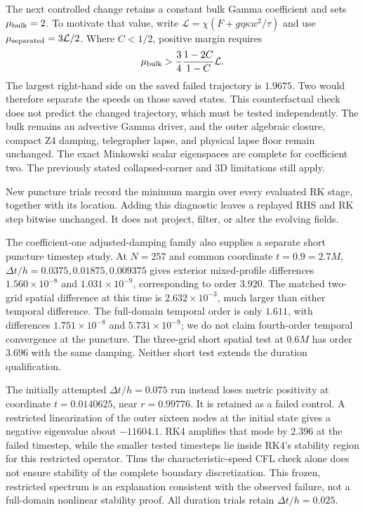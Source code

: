 \documentclass[11pt]{article}
\begin{document}
The next controlled change retains a constant bulk Gamma coefficient and sets $\mu_{\rm bulk}=2$. To motivate that value, write $\mathcal L=\chi(F+g\eta\kappa w^2/\tau)$ and use $\mu_{\rm separated}=3\mathcal L/2$. Where $C<1/2$, positive margin requires
\begin{equation}
 \mu_{\rm bulk}>\frac34\frac{1-2C}{1-C}\mathcal L.
\end{equation}
The largest right-hand side on the saved failed trajectory is $1.9675$. Two would therefore separate the speeds on those saved states. This counterfactual check does not predict the changed trajectory, which must be tested independently. The bulk remains an advective Gamma driver, and the outer algebraic closure, compact Z4 damping, telegrapher lapse, and physical lapse floor remain unchanged. The exact Minkowski scalar eigenspaces are complete for coefficient two. The previously stated collapsed-corner and 3D limitations still apply.

New puncture trials record the minimum margin over every evaluated RK stage, together with its location. Adding this diagnostic leaves a replayed RHS and RK step bitwise unchanged. It does not project, filter, or alter the evolving fields.

The coefficient-one adjusted-damping family also supplies a separate short puncture timestep study. At $N=257$ and common coordinate $t=0.9=2.7M$, $\Delta t/h=0.0375,\allowbreak 0.01875,\allowbreak 0.009375$ gives exterior mixed-profile differences $1.560\times10^{-8}$ and $1.031\times10^{-9}$, corresponding to order $3.920$. The matched two-grid spatial difference at this time is $2.632\times10^{-3}$, much larger than either temporal difference. The full-domain temporal order is only $1.611$, with differences $1.751\times10^{-8}$ and $5.731\times10^{-9}$; we do not claim fourth-order temporal convergence at the puncture. The three-grid short spatial test at $0.6M$ has order $3.696$ with the same damping. Neither short test extends the duration qualification.

The initially attempted $\Delta t/h=0.075$ run instead loses metric positivity at coordinate $t=0.0140625$, near $r=0.99776$. It is retained as a failed control. A restricted linearization of the outer sixteen nodes at the initial state gives a negative eigenvalue about $-11604.1$. RK4 amplifies that mode by $2.396$ at the failed timestep, while the smaller tested timesteps lie inside RK4's stability region for this restricted operator. Thus the characteristic-speed CFL check alone does not ensure stability of the complete boundary discretization. This frozen, restricted spectrum is an explanation consistent with the observed failure, not a full-domain nonlinear stability proof. All duration trials retain $\Delta t/h=0.025$.
\end{document}
